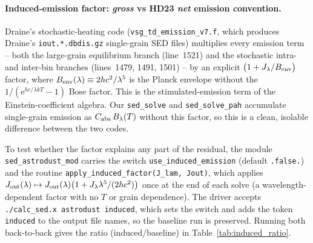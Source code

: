 \documentclass{my_memo}
\begin{document}
\paragraph{Induced-emission factor: \emph{gross} vs HD23
\emph{net} emission convention.} Draine's stochastic-heating code
(\texttt{vsg\_td\_emission\_v7.f}, which produces Draine's
\texttt{iout.*.dbdis.gz} single-grain SED files) multiplies every
emission term -- both the large-grain equilibrium branch (line~1521)
and the stochastic intra- and inter-bin branches (lines~1479, 1491,
1501) -- by an explicit $\bigl(1 + J_\lambda/B_{\rm env}\bigr)$ factor,
where $B_{\rm env}(\lambda) \equiv 2hc^2/\lambda^5$ is the Planck
envelope without the $1/(\mathrm{e}^{hc/\lambda k T} - 1)$ Bose
factor. This is the stimulated-emission term of the Einstein-coefficient
algebra. Our \texttt{sed\_solve} and \texttt{sed\_solve\_pah}
accumulate single-grain emission as $C_{\rm abs}\,B_\lambda(T)$
without this factor, so this is a clean, isolable difference between
the two codes.

To test whether the factor explains any part of the residual, the
module \texttt{sed\_astrodust\_mod} carries the switch
\texttt{use\_induced\_emission} (default \texttt{.false.}) and the
routine \texttt{apply\_induced\_factor(J\_lam, Jout)}, which applies
\(
   J_{\rm out}(\lambda) \mapsto J_{\rm out}(\lambda)\bigl(
   1 + J_\lambda \lambda^5 / (2hc^2)\bigr)
\)
once at the end of each solve (a wavelength-dependent factor with no
$T$ or grain dependence). The driver accepts
\texttt{./calc\_sed.x astrodust induced}, which sets the switch and adds
the token \texttt{induced} to the output file names, so the baseline
run is preserved. Running both back-to-back gives the ratio
(induced$/$baseline) in Table~\ref{tab:induced_ratio}.
\end{document}
